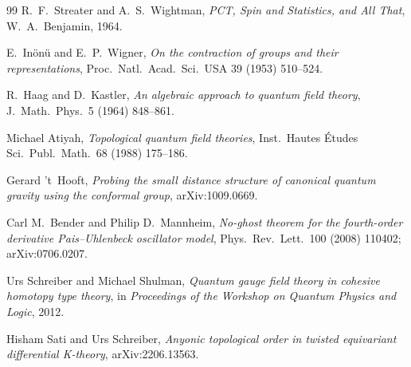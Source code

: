 \documentclass{article}
\theoremstyle{definition}
\begin{document}
\begin{thebibliography}{99}
R.\ F.\ Streater and A.\ S.\ Wightman,
\emph{PCT, Spin and Statistics, and All That},
W.\ A.\ Benjamin, 1964.

E.\ In\"on\"u and E.\ P.\ Wigner,
\emph{On the contraction of groups and their representations},
Proc.\ Natl.\ Acad.\ Sci.\ USA 39 (1953) 510--524.

R.\ Haag and D.\ Kastler,
\emph{An algebraic approach to quantum field theory},
J.\ Math.\ Phys.\ 5 (1964) 848--861.

Michael Atiyah,
\emph{Topological quantum field theories},
Inst.\ Hautes \'Etudes Sci.\ Publ.\ Math.\ 68 (1988) 175--186.

Gerard 't~Hooft,
\emph{Probing the small distance structure of canonical quantum gravity
using the conformal group},
arXiv:1009.0669.

Carl M.\ Bender and Philip D.\ Mannheim,
\emph{No-ghost theorem for the fourth-order derivative Pais--Uhlenbeck
oscillator model},
Phys.\ Rev.\ Lett.\ 100 (2008) 110402;
arXiv:0706.0207.

Urs Schreiber and Michael Shulman,
\emph{Quantum gauge field theory in cohesive homotopy type theory},
in \emph{Proceedings of the Workshop on Quantum Physics and Logic}, 2012.

Hisham Sati and Urs Schreiber,
\emph{Anyonic topological order in twisted equivariant differential
K-theory},
arXiv:2206.13563.

\end{thebibliography}
\end{document}
